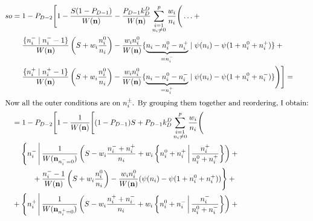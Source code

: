 \documentclass[a4paper]{article}
\theoremstyle{definition}
\begin{document}
\begin{align}
{        %
        so}
        &= 1 - P_{D-2} \Bigg[
            1 - \frac {S (1 - P_{D-1})} {W(\mathbf n)}
            - \frac {P_{D-1} k^D_D} {W(\mathbf n)}
            \sum_{\substack{i=1 \\ n_i \ne 0}}^p  \frac {w_i} {n_i} \Bigg( \ldots + {} \notag \\
                & \phantom{{}={}}
                \frac {\{ n^-_i \mid n^-_i - 1 \}} {W(\mathbf n)}
                \left( S + w_i \frac{n^0_i} {n_i} \right) -
                \frac {w_i n^0_i} {W(\mathbf n)}
                \{ \underbrace{n_i - n^0_i - n^+_i}_{=n^-_i} \mid
                    \psi(n_i) - \psi(1 + n^0_i + n^+_i) \} + {} \notag \\
                & \phantom{{}={}}
                \frac {\{ n^+_i \mid n^+_i - 1 \}} {W(\mathbf n)}
                \left( S + w_i \frac{n^0_i} {n_i} \right) -
                \frac {w_i n^0_i} {W(\mathbf n)}
                \{ \underbrace{n_i - n^0_i - n^-_i}_{=n^+_i} \mid
                    \psi(n_i) - \psi(1 + n^0_i + n^-_i) \}
            \Bigg)
        \Bigg] = \notag \\
        \intertext{Now all the outer conditions are on $n^\pm_i$. By grouping
        them together and reordering, I obtain:}
        &= 1 - P_{D-2} \Bigg[1 - \frac 1 {W(\mathbf n)} \Bigg[
            (1 - P_{D-1}) S +
            P_{D-1} k^D_D
            \sum_{\substack{i=1 \\ n_i \ne0}}^p \frac {w_i} {n_i} \Bigg( \notag \\
                & \phantom{{}+{}}
                \Bigg\{n^-_i \,\Bigg|\,
                \frac 1 {W(\mathbf n_{n^-_i=0})} \left( S
                - w_i \frac{n^-_i + n^+_i} {n_i}
                + w_i \left\{n^0_i + n^+_i \,\middle|\, \frac {n^+_i} {n^0_i + n^+_i}\right\}\right) + {} \notag \\
                & \phantom{\Bigg\{n^-_i \,\Bigg|\,}
                {} + \frac {n^-_i - 1} {W(\mathbf n)}
                \left(S + w_i \frac {n^0_i} {n_i}\right)
                - \frac {w_i n^0_i} {W(\mathbf n)}
                (\psi(n_i) - \psi(1 + n^0_i + n^+_i)) \Bigg\} + {} \notag \\
                & {} +
                \Bigg\{n^+_i \,\Bigg|\,
                \frac 1 {W(\mathbf n_{n^+_i=0})} \left( S
                - w_i \frac{n^+_i + n^-_i} {n_i}
                + w_i \left\{n^0_i + n^-_i \,\middle|\, \frac {n^-_i} {n^0_i + n^-_i}\right\}\right) + {} \notag \\

\end{align}
\end{document}
